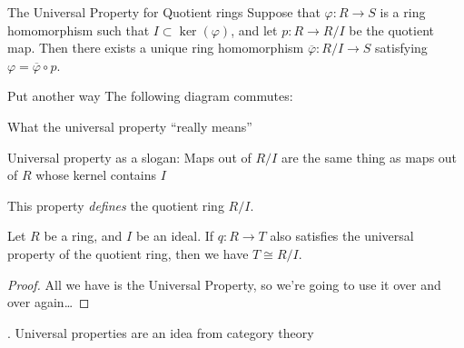 \documentclass{beamer}
\begin{document}
\begin{frame}[fragile]{The Universal Property for Quotient rings}
Suppose that $\varphi:R \to S$ is a ring homomorphism such that $I\subset \ker(\varphi)$, and let $p:R\to R/I$ be the quotient map.   Then there exists a unique ring homomorphism $\overline{\varphi}:R/I\to S$ satisfying $\varphi=\overline{\varphi}\circ p$.

\begin{block}{Put another way}
The following diagram commutes:
\begin{center}
\end{center}
\end{block}

\end{frame}

\begin{frame}{What the universal property ``really means''}
\begin{block}{Universal property as a slogan:}
Maps out of $R/I$ are the same thing as maps out of $R$ whose kernel contains $I$
\end{block}

This property \emph{defines} the quotient ring $R/I$.

\begin{lemma} Let $R$ be a ring, and $I$ be an ideal.  If $q:R\to T$ also satisfies the universal property of the quotient ring, then we have $T\cong R/I$.
\end{lemma}

\begin{proof}
 All we have is the Universal Property, so we're going to use it over and over again\dots
  \end{proof}.
Universal properties are an idea from category theory
\end{frame}
\end{document}
